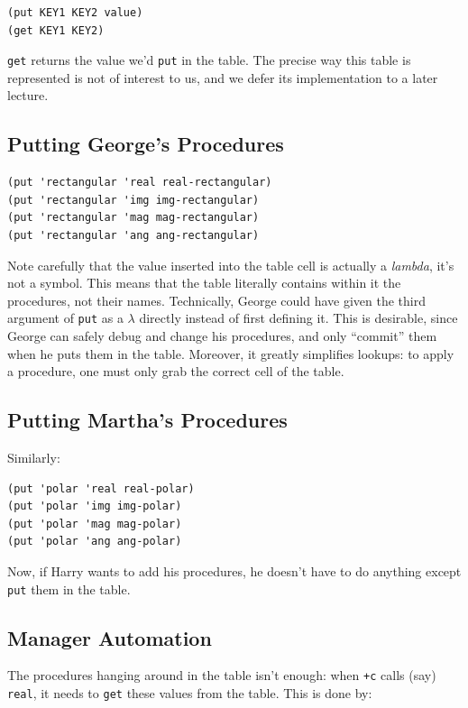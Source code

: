 \documentclass[9pt]{report}
\begin{document}
\begin{verbatim}
(put KEY1 KEY2 value)
(get KEY1 KEY2)
\end{verbatim}

\texttt{get} returns the value we'd \texttt{put} in the table. The precise way
this table is represented is not of interest to us, and we defer
its implementation to a later lecture.

\subsection{Putting George's Procedures}
\label{sec:org18d6821}

\begin{verbatim}
(put 'rectangular 'real real-rectangular)
(put 'rectangular 'img img-rectangular)
(put 'rectangular 'mag mag-rectangular)
(put 'rectangular 'ang ang-rectangular)
\end{verbatim}

Note carefully that the value inserted into the table cell is
actually a \emph{lambda}, it's not a symbol. This means that the table
literally contains within it the procedures, not their names.
Technically, George could have given the third argument of \texttt{put}
as a \(\lambda\) directly instead of first defining it. This is
desirable, since George can safely debug and change his
procedures, and only ``commit'' them when he puts them in the table.
Moreover, it greatly simplifies lookups: to apply a procedure, one
must only grab the correct cell of the table.


\subsection{Putting Martha's Procedures}
\label{sec:org8b57705}
Similarly:
\begin{verbatim}
(put 'polar 'real real-polar)
(put 'polar 'img img-polar)
(put 'polar 'mag mag-polar)
(put 'polar 'ang ang-polar)
\end{verbatim}

Now, if Harry wants to add his procedures, he doesn't have to do
anything except \texttt{put} them in the table.

\subsection{Manager Automation}
\label{sec:orgba214b0}

The procedures hanging around in the table isn't enough: when \texttt{+c}
calls (say) \texttt{real}, it needs to \texttt{get} these values from the table.
This is done by:
\end{document}
